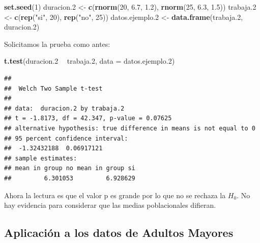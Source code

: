 \documentclass[]{book}
\newenvironment{Shaded}{\begin{snugshade}}{\end{snugshade}}
\newcommand{\DataTypeTok}[1]{\textcolor[rgb]{0.13,0.29,0.53}{#1}}
\newcommand{\DecValTok}[1]{\textcolor[rgb]{0.00,0.00,0.81}{#1}}
\newcommand{\FloatTok}[1]{\textcolor[rgb]{0.00,0.00,0.81}{#1}}
\newcommand{\KeywordTok}[1]{\textcolor[rgb]{0.13,0.29,0.53}{\textbf{#1}}}
\newcommand{\NormalTok}[1]{#1}
\newcommand{\OperatorTok}[1]{\textcolor[rgb]{0.81,0.36,0.00}{\textbf{#1}}}
\newcommand{\StringTok}[1]{\textcolor[rgb]{0.31,0.60,0.02}{#1}}
\begin{document}
\begin{Shaded}
\begin{Highlighting}[]
\KeywordTok{set.seed}\NormalTok{(}\DecValTok{1}\NormalTok{)}
\NormalTok{duracion}\FloatTok{.2}\NormalTok{ <-}\StringTok{ }\KeywordTok{c}\NormalTok{(}\KeywordTok{rnorm}\NormalTok{(}\DecValTok{20}\NormalTok{, }\FloatTok{6.7}\NormalTok{, }\FloatTok{1.2}\NormalTok{), }\KeywordTok{rnorm}\NormalTok{(}\DecValTok{25}\NormalTok{, }\FloatTok{6.3}\NormalTok{, }\FloatTok{1.5}\NormalTok{))}
\NormalTok{trabaja}\FloatTok{.2}\NormalTok{ <-}\StringTok{ }\KeywordTok{c}\NormalTok{(}\KeywordTok{rep}\NormalTok{(}\StringTok{"si"}\NormalTok{, }\DecValTok{20}\NormalTok{), }\KeywordTok{rep}\NormalTok{(}\StringTok{"no"}\NormalTok{, }\DecValTok{25}\NormalTok{))}
\NormalTok{datos.ejemplo}\FloatTok{.2}\NormalTok{ <-}\StringTok{ }\KeywordTok{data.frame}\NormalTok{(trabaja}\FloatTok{.2}\NormalTok{, duracion}\FloatTok{.2}\NormalTok{)}
\end{Highlighting}
\end{Shaded}

Solicitamos la prueba como antes:

\begin{Shaded}
\begin{Highlighting}[]
\KeywordTok{t.test}\NormalTok{(duracion}\FloatTok{.2} \OperatorTok{~}\StringTok{ }\NormalTok{trabaja}\FloatTok{.2}\NormalTok{, }\DataTypeTok{data =}\NormalTok{ datos.ejemplo}\FloatTok{.2}\NormalTok{)}
\end{Highlighting}
\end{Shaded}

\begin{verbatim}
## 
##  Welch Two Sample t-test
## 
## data:  duracion.2 by trabaja.2
## t = -1.8173, df = 42.347, p-value = 0.07625
## alternative hypothesis: true difference in means is not equal to 0
## 95 percent confidence interval:
##  -1.32432188  0.06917121
## sample estimates:
## mean in group no mean in group si 
##         6.301053         6.928629
\end{verbatim}

Ahora la lectura es que el valor p es grande por lo que no se rechaza la \(H_{0}\). No hay evidencia para considerar que las medias poblacionales difieran.

\hypertarget{aplicaciuxf3n-a-los-datos-de-adultos-mayores}{%
\subsection{Aplicación a los datos de Adultos Mayores}\label{aplicaciuxf3n-a-los-datos-de-adultos-mayores}}
\end{document}

